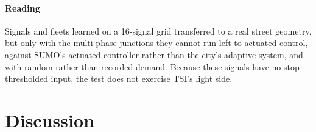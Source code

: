 \paragraph{Reading} Signals and fleets learned on a 16-signal grid transferred to a real street geometry, but only with the multi-phase
junctions they cannot run left to actuated control, against SUMO's actuated controller rather than the city's adaptive system, and with
random rather than recorded demand. Because these signals have no stop-thresholded input, the test does not exercise TSI's light side.

\section{Discussion}\label{sec:discussion}
